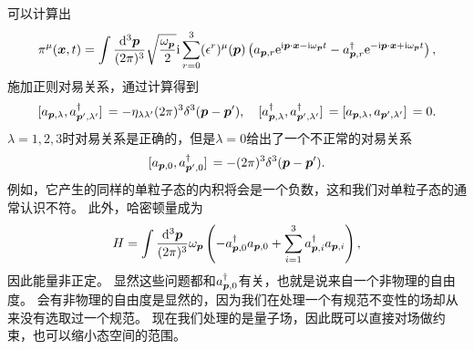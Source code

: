 可以计算出
\begin{equation}
    \pi^\mu (\vb*{x}, t) = \int \frac{\dd[3]{\vb*{p}}}{(2\pi)^3} \sqrt{\frac{\omega_{\vb*{p}}}{2}} \mathrm{i} \sum_{r=0}^3 (\epsilon^r)^\mu (\vb*{p}) \left( {a}_{\vb*{p}, r} \mathrm{e}^{\mathrm{i} \vb*{p} \cdot \vb*{x} - \mathrm{i} \omega_{\vb*{p}} t} - {a}_{\vb*{p}, r}^\dagger \mathrm{e}^{ - \mathrm{i} \vb*{p} \cdot \vb*{x} + \mathrm{i} \omega_{\vb*{p}} t} \right),
\end{equation}
施加正则对易关系，通过计算得到
\begin{equation}
    \comm*{{a}_{\vb*{p}, \lambda}}{{a}^\dagger_{\vb*{p}', \lambda'}} = - \eta_{\lambda \lambda'} (2\pi)^3 \delta^3(\vb*{p} - \vb*{p}'), \quad \comm*{{a}^\dagger_{\vb*{p}, \lambda}}{{a}^\dagger_{\vb*{p}', \lambda'}} = \comm*{{a}_{\vb*{p}, \lambda}}{{a}_{\vb*{p}', \lambda'}} = 0.
\end{equation}
$\lambda=1, 2, 3$时对易关系是正确的，但是$\lambda=0$给出了一个不正常的对易关系
\[
    \comm*{{a}_{\vb*{p}, 0}}{{a}^\dagger_{\vb*{p}', 0}} = - (2\pi)^3 \delta^3 (\vb*{p} - \vb*{p}').
\]
例如，它产生的同样的单粒子态的内积将会是一个负数，这和我们对单粒子态的通常认识不符。
此外，哈密顿量成为
\begin{equation}
    {H} = \int \frac{\dd[3]{\vb*{p}}}{(2\pi)^3} \omega_{\vb*{p}} \left( - {a}_{\vb*{p},0}^\dagger {a}_{\vb*{p}, 0} + \sum_{i=1}^3 {a}_{\vb*{p},i}^\dagger {a}_{\vb*{p}, i} \right),
\end{equation}
因此能量非正定。
显然这些问题都和${a}^\dagger_{\vb*{p},0}$有关，也就是说来自一个非物理的自由度。
会有非物理的自由度是显然的，因为我们在处理一个有规范不变性的场却从来没有选取过一个规范。
现在我们处理的是量子场，因此既可以直接对场做约束，也可以缩小态空间的范围。

